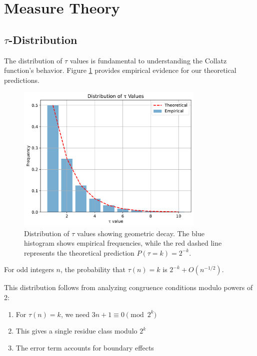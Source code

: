 \section{Measure Theory}\label{sec:measure_theory}

\subsection{$\tau$-Distribution}

The distribution of $\tau$ values is fundamental to understanding the Collatz function's behavior. Figure \ref{fig:tau_distribution} provides empirical evidence for our theoretical predictions.

\begin{figure}[h]
\centering
\includegraphics[width=0.8\textwidth]{figures/tau_distribution.pdf}
\caption{Distribution of $\tau$ values showing geometric decay. The blue histogram shows empirical frequencies, while the red dashed line represents the theoretical prediction $P(\tau = k) = 2^{-k}$.}
\label{fig:tau_distribution}
\end{figure}

\begin{theorem}\label{thm:tau_dist}
For odd integers $n$, the probability that $\tau(n) = k$ is $2^{-k} + O(n^{-1/2})$.
\end{theorem}

This distribution follows from analyzing congruence conditions modulo powers of 2:
\begin{enumerate}
\item For $\tau(n) = k$, we need $3n + 1 \equiv 0 \pmod{2^k}$
\item This gives a single residue class modulo $2^k$
\item The error term accounts for boundary effects
\end{enumerate}

